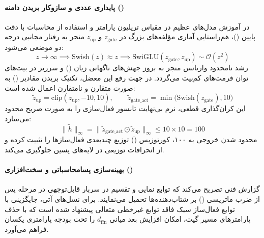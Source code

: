 \paragraph*{پایداری عددی و سازوکار بریدن دامنه ()}
در آموزش مدل‌های عظیم در مقیاس تریلیون پارامتر و استفاده از محاسبات با دقت پایین ()، هم‌راستایی آماری مؤلفه‌های بزرگ در $z_{\text{gate}}$ و $z_{\text{up}}$ منجر به رفتار مجانبی درجه دو موضعی می‌شود:
\begin{equation}
    z \to \infty \implies \text{Swish}(z) \approx z \implies \text{SwiGLU}(z_{\text{gate}}, z_{\text{up}}) \sim \mathcal{O}(z^2)
\end{equation}
رشد نامحدود واریانس منجر به بروز جهش‌های ناگهانی زیان () و سرریز در بیت‌های توان فرمت‌های کم‌بیت می‌گردد. در  جهت رفع این معضل، تکنیک بریدن مقادیر () به صورت متقارن و نامتقارن اعمال شده است:
\begin{equation}
    \widetilde{z}_{\text{up}} = \text{clip}(z_{\text{up}}, -10, 10), \qquad \widetilde{z}_{\text{gate\_act}} = \min\big(\text{Swish}(z_{\text{gate}}), 10\big)
\end{equation}
این کران‌گذاری قطعی، نرم بی‌نهایت تانسور فعال‌سازی را به صورت صریح محدود می‌سازد:
\begin{equation}
    \|\widetilde{h}\|_\infty = \|\widetilde{z}_{\text{gate\_act}} \odot \widetilde{z}_{\text{up}}\|_\infty \le 10 \times 10 = 100
\end{equation}
محدود شدن خروجی به ۱۰۰، کورتوزیس () توزیع چندبعدی فعال‌سازها را تثبیت کرده و از انحرافات توزیعی در لایه‌های پسین جلوگیری می‌کند.

\paragraph*{بهینه‌سازی پسا‌محاسباتی و سخت‌افزاری ()}
گزارش فنی  تصریح می‌کند که توابع نمایی و تقسیم در  سربار قابل‌توجهی در مرحله پس از ضرب ماتریسی () بر شتاب‌دهنده‌ها تحمیل می‌نمایند. برای نسل‌های آتی، جایگزینی  با توابع فعال‌ساز سبک فاقد توابع غیرخطی متعالی پیشنهاد شده است که با حذف پارامترهای مسیر گیت، امکان افزایش بعد میانی $d_{\text{ffn}}$ را تحت بودجه پارامتری یکسان فراهم می‌آورد.

